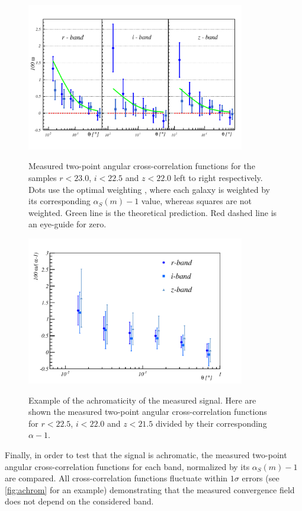 \begin{figure}
\begin{center}
\includegraphics[width=0.85\textwidth]{./figures/weighted_w.pdf}
\caption{Measured two-point angular cross-correlation functions for the samples $r<23.0$, $i < 22.5$ and $z < 22.0$ left to right respectively. Dots use the optimal weighting \cite{0004-637X-633-2-589}, where each galaxy is weighted by its corresponding $\alpha_S(m)-1$ value, whereas squares are not weighted. Green line is the theoretical prediction. Red dashed line is an eye-guide for zero.}
\label{fig:reweight}
\includegraphics[width=0.85\textwidth]{./figures/acromatic_short.pdf}
\caption{Example of the achromaticity of the measured signal. Here are shown the measured two-point angular cross-correlation functions for $r<22.5$, $i<22.0$ and $z<21.5$ divided by their corresponding $\alpha-1$.}
\label{fig:achrom}
\end{center}
\end{figure}
\newline
 
 Finally, in order to test that the signal is achromatic, the measured two-point angular cross-correlation functions for each band, normalized by its $\alpha_S(m)-1$ are compared. All cross-correlation functions fluctuate within $1\sigma$ errors (see \autoref{fig:achrom} for an example) demonstrating that the measured convergence field does not depend on the considered band.

